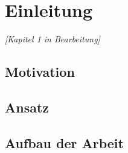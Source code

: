 \chapter{Einleitung}
\label{cha:Einleitung}
\textit{[Kapitel 1 in Bearbeitung]}
\section{Motivation}
\section{Ansatz}
\section{Aufbau der Arbeit}